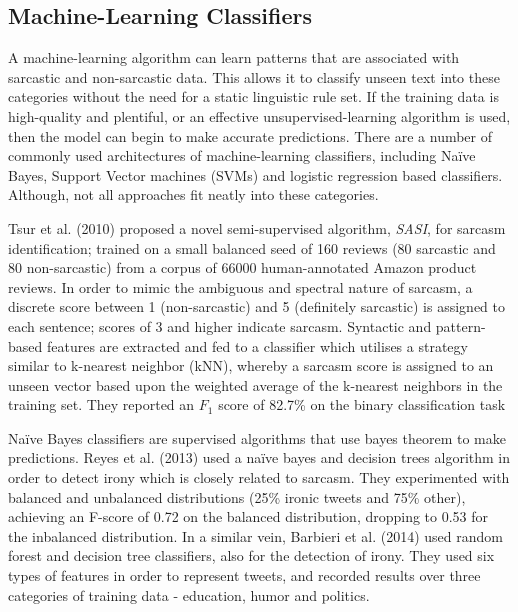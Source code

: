 \documentclass[12pt,a4paper]{article}
\begin{document}
\subsection{Machine-Learning Classifiers}\vspace{-10pt}
\noindent A machine-learning algorithm can learn patterns that are associated with sarcastic and non-sarcastic data. This allows it to classify unseen text into these categories without the need for a static linguistic rule set. If the training data is high-quality and plentiful, or an effective unsupervised-learning algorithm is used, then the model can begin to make accurate predictions. There are a number of commonly used architectures of machine-learning classifiers, including Na\"{i}ve Bayes, Support Vector machines (SVMs) and logistic regression based classifiers. Although, not all approaches fit neatly into these categories.

Tsur et al. (2010) \cite{tsur2010icwsm} proposed a novel semi-supervised algorithm, \textit{SASI}, for sarcasm identification; trained on a small balanced seed of 160 reviews (80 sarcastic and 80 non-sarcastic) from a corpus of 66000 human-annotated Amazon product reviews. In order to mimic the ambiguous and spectral nature of sarcasm, a discrete score between 1 (non-sarcastic) and 5 (definitely sarcastic) is assigned to each sentence; scores of 3 and higher indicate sarcasm. Syntactic and pattern-based features are extracted and fed to a classifier which utilises a strategy similar to k-nearest neighbor (kNN), whereby a sarcasm score is assigned to an unseen vector based upon the weighted average of the k-nearest neighbors in the training set. They reported an $F_{1}$ score of 82.7\% on the binary classification task

Na\"{i}ve Bayes classifiers are supervised algorithms that use bayes theorem to make predictions. Reyes et al. (2013) \cite{reyes2013multidimensional} used a na\"{i}ve bayes and decision trees algorithm in order to detect irony which is closely related to sarcasm. They experimented with balanced and unbalanced distributions (25\% ironic tweets and 75\% other), achieving an F-score of 0.72 on the balanced distribution, dropping to 0.53 for the inbalanced distribution. In a similar vein, Barbieri et al. (2014) \cite{barbieri2014modelling} used random forest and decision tree classifiers, also for the detection of irony. They used six types of features in order to represent tweets, and recorded results over three categories of training data - education, humor and politics.
\end{document}
